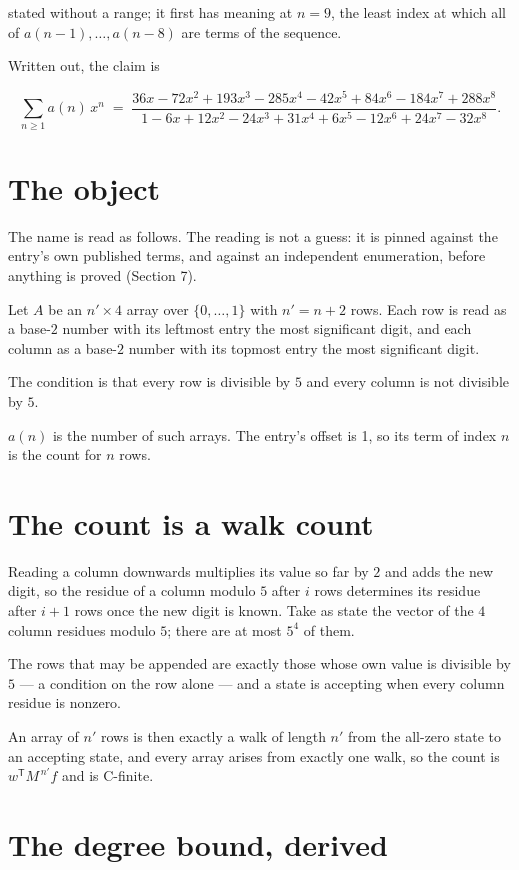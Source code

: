 \documentclass[11pt]{article}
\theoremstyle{definition}
\begin{document}
stated without a range; it first has meaning at $n = 9$, the least index at which all of $a(n-1),\dots,a(n-8)$ are terms of the sequence.

Written out, the claim is

\[\sum_{n \ge 1} a(n)\,x^n \;=\; \frac{36x - 72x^{2} + 193x^{3} - 285x^{4} - 42x^{5} + 84x^{6} - 184x^{7} + 288x^{8}}{1 - 6x + 12x^{2} - 24x^{3} + 31x^{4} + 6x^{5} - 12x^{6} + 24x^{7} - 32x^{8}}.\]

\section{The object}

The name is read as follows. The reading is not a guess: it is pinned against the entry's own published terms, and against an independent enumeration, before anything is proved (Section 7).

Let $A$ be an $n' \times 4$ array over $\{0,\dots,1\}$ with $n' = n + 2$ rows. Each row is read as a base-$2$ number with its leftmost entry the most significant digit, and each column as a base-$2$ number with its topmost entry the most significant digit.

The condition is that every row is divisible by $5$ and every column is not divisible by $5$.

$a(n)$ is the number of such arrays. The entry's offset is 1, so its term of index $n$ is the count for $n$ rows.

\section{The count is a walk count}

Reading a column downwards multiplies its value so far by $2$ and adds the new digit, so the residue of a column modulo $5$ after $i$ rows determines its residue after $i+1$ rows once the new digit is known. Take as state the vector of the $4$ column residues modulo $5$; there are at most $5^{4}$ of them.

The rows that may be appended are exactly those whose own value is divisible by $5$ --- a condition on the row alone --- and a state is accepting when every column residue is nonzero.

An array of $n'$ rows is then exactly a walk of length $n'$ from the all-zero state to an accepting state, and every array arises from exactly one walk, so the count is $w^{\mathsf T}M^{\,n'}f$ and is C-finite.

\section{The degree bound, derived}
\end{document}
